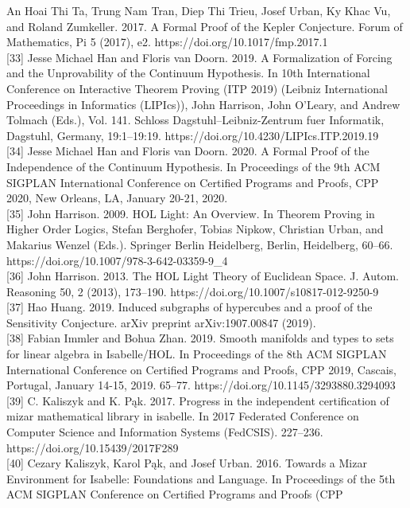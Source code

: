 \documentclass[
]{article}
\begin{document}
An Hoai Thi Ta, Trung Nam Tran, Diep Thi Trieu, Josef Urban, Ky Khac Vu,
and Roland Zumkeller. 2017. A Formal Proof of the Kepler Conjecture.
Forum of Mathematics, Pi 5 (2017), e2.
https://doi.org/10.1017/fmp.2017.1\\
{[}33{]} Jesse Michael Han and Floris van Doorn. 2019. A Formalization
of Forcing and the Unprovability of the Continuum Hypothesis. In 10th
International Conference on Interactive Theorem Proving (ITP 2019)
(Leibniz International Proceedings in Informatics (LIPIcs)), John
Harrison, John O'Leary, and Andrew Tolmach (Eds.), Vol. 141. Schloss
Dagstuhl--Leibniz-Zentrum fuer Informatik, Dagstuhl, Germany,
19:1--19:19. https://doi.org/10.4230/LIPIcs.ITP.2019.19\\
{[}34{]} Jesse Michael Han and Floris van Doorn. 2020. A Formal Proof of
the Independence of the Continuum Hypothesis. In Proceedings of the 9th
ACM SIGPLAN International Conference on Certified Programs and Proofs,
CPP 2020, New Orleans, LA, January 20-21, 2020.\\
{[}35{]} John Harrison. 2009. HOL Light: An Overview. In Theorem Proving
in Higher Order Logics, Stefan Berghofer, Tobias Nipkow, Christian
Urban, and Makarius Wenzel (Eds.). Springer Berlin Heidelberg, Berlin,
Heidelberg, 60--66. https://doi.org/10.1007/978-3-642-03359-9\_4\\
{[}36{]} John Harrison. 2013. The HOL Light Theory of Euclidean Space.
J. Autom. Reasoning 50, 2 (2013), 173--190.
https://doi.org/10.1007/s10817-012-9250-9\\
{[}37{]} Hao Huang. 2019. Induced subgraphs of hypercubes and a proof of
the Sensitivity Conjecture. arXiv preprint arXiv:1907.00847 (2019).\\
{[}38{]} Fabian Immler and Bohua Zhan. 2019. Smooth manifolds and types
to sets for linear algebra in Isabelle/HOL. In Proceedings of the 8th
ACM SIGPLAN International Conference on Certified Programs and Proofs,
CPP 2019, Cascais, Portugal, January 14-15, 2019. 65--77.
https://doi.org/10.1145/3293880.3294093\\
{[}39{]} C. Kaliszyk and K. Pąk. 2017. Progress in the independent
certification of mizar mathematical library in isabelle. In 2017
Federated Conference on Computer Science and Information Systems
(FedCSIS). 227--236. https://doi.org/10.15439/2017F289\\
{[}40{]} Cezary Kaliszyk, Karol Pąk, and Josef Urban. 2016. Towards a
Mizar Environment for Isabelle: Foundations and Language. In Proceedings
of the 5th ACM SIGPLAN Conference on Certified Programs and Proofs (CPP
\end{document}
